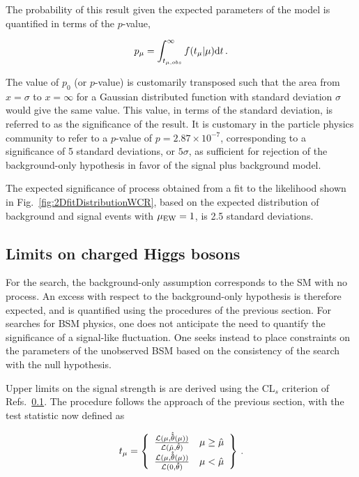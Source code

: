 The probability of this result given the expected
parameters of the model is quantified in terms of the $p$-value,

\begin{equation}
  p_{\mu} = \int_{t_{\mu, obs}}^{\infty} f(t_{\mu} | \mu) {\rm d}t \,.
  \label{eq:pvalue}
\end{equation}

The value of $p_{0}$ (or $p$-value) is customarily transposed such that the area from
$x=\sigma$ to $x=\infty$ for a Gaussian distributed function with standard
deviation $\sigma$ would give the same value. This value, in terms of the standard
deviation, is referred to as the significance of the result.
It is customary in the particle physics community to refer to a $p$-value
of $p = 2.87 \times 10^{-7}$, corresponding to a significance of 5 standard 
deviations, or $5 \sigma$, as sufficient for rejection of the background-only
hypothesis in favor of the signal plus background model. 

The expected significance of \EWWZ process obtained from a fit to the likelihood
shown in Fig.~\ref{fig:2DfitDistributionWCR},
based on the expected distribution
of background and signal events with $\mu_{\rm EW} = 1$, is 2.5 standard deviations.

\subsection{Limits on charged Higgs bosons}

For the \EWWZ search, the background-only assumption corresponds to the SM with
no \EWWZ process. An excess with respect to the background-only hypothesis is therefore
expected, and is quantified using the procedures of the previous section. For searches 
for BSM physics, one does not anticipate the need to quantify the significance of a signal-like
fluctuation. One seeks instead to place constraints on the parameters of the unobserved BSM
based on the consistency of the search with the null hypothesis. 

Upper limits on the signal strength is are derived using the CL$_{s}$ criterion of Refs.~\ref{}.
The procedure follows the approach of the previous section, with the test statistic now
defined as

\begin{equation}
  t_{\mu} = \left\{ 
\begin{array}{c l}
  \frac{\mathcal{L}(\mu,{\bf \hat{\hat{\theta}}}(\mu))}
    {\mathcal{L}(\hat{\mu},{\bf \hat{\theta}})}           & \mu \ge \hat{\mu} \\
  \frac{\mathcal{L}(\mu,{\bf \hat{\hat{\theta}}}(\mu))}
    {\mathcal{L}(0,{\bf \hat{\theta}})}           & \mu < \hat{\mu} \\

\end{array}\right\} \,.
\end{equation}


